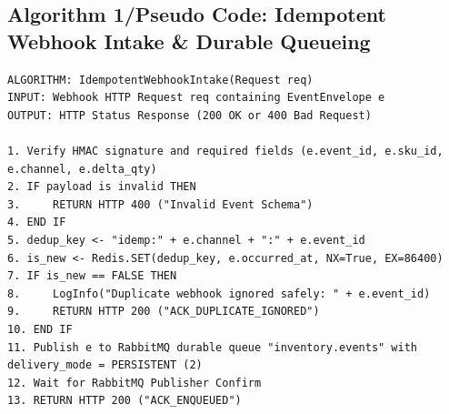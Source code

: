 \documentclass[oneside,a4paper,12pt]{report}
\begin{document}
\subsection{Algorithm 1/Pseudo Code: Idempotent Webhook Intake \& Durable Queueing}
\begin{lstlisting}[caption={Algorithm 1: Atomic Duplicate Check and Durable Event Enqueue (Node.js + Redis + RabbitMQ)}]
ALGORITHM: IdempotentWebhookIntake(Request req)
INPUT: Webhook HTTP Request req containing EventEnvelope e
OUTPUT: HTTP Status Response (200 OK or 400 Bad Request)

1. Verify HMAC signature and required fields (e.event_id, e.sku_id, e.channel, e.delta_qty)
2. IF payload is invalid THEN
3.     RETURN HTTP 400 ("Invalid Event Schema")
4. END IF
5. dedup_key <- "idemp:" + e.channel + ":" + e.event_id
6. is_new <- Redis.SET(dedup_key, e.occurred_at, NX=True, EX=86400)
7. IF is_new == FALSE THEN
8.     LogInfo("Duplicate webhook ignored safely: " + e.event_id)
9.     RETURN HTTP 200 ("ACK_DUPLICATE_IGNORED")
10. END IF
11. Publish e to RabbitMQ durable queue "inventory.events" with delivery_mode = PERSISTENT (2)
12. Wait for RabbitMQ Publisher Confirm
13. RETURN HTTP 200 ("ACK_ENQUEUED")
\end{lstlisting}
\end{document}
